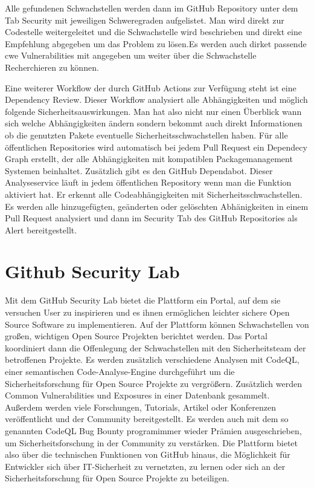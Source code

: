 Alle gefundenen Schwachstellen werden dann im GitHub Repository unter dem Tab Security mit jeweiligen Schweregraden aufgelistet. Man wird direkt zur Codestelle weitergeleitet und die Schwachstelle wird beschrieben und direkt eine Empfehlung abgegeben um das Problem zu lösen.Es werden auch dirket passende \ac{cwe} Vulnerabilities mit angegeben um weiter über die Schwachstelle Recherchieren zu können. \cite{code-scanning}

Eine weiterer Workflow der durch GitHub Actions zur Verfügung steht ist eine Dependency Review. Dieser Workflow analysiert alle Abhängigkeiten und möglich folgende Sicherheitsauswirkungen. Man hat also nicht nur einen Überblick wann sich welche Abhängigkeiten ändern sondern bekommt auch direkt Informationen ob die genutzten Pakete eventuelle Sicherheitsschwachstellen haben.
Für alle öffentlichen Repositories wird automatisch bei jedem Pull Request ein Dependecy Graph erstellt, der alle Abhängigkeiten mit kompatiblen Packagemanagement Systemen beinhaltet.
Zusätzlich gibt es den GitHub Dependabot. Dieser Analyseservice läuft in jedem öffentlichen Repository wenn man die Funktion aktiviert hat. Er erkennt alle Codeabhängigkeiten mit Sicherheitsschwachstellen. Es werden alle hinzugefügten, geänderten oder gelöschten Abhänigkeiten in einem Pull Request analysiert und dann im Security Tab des GitHub Repositories als Alert bereitgestellt.

\section{Github Security Lab}
Mit dem GitHub Security Lab bietet die Plattform ein Portal, auf dem sie versuchen User zu inspirieren und es ihnen ermöglichen leichter sichere Open Source Software zu implementieren. 
Auf der Plattform können Schwachstellen von großen, wichtigen Open Source Projekten berichtet werden. Das Portal koordiniert dann die Offenlegung der Schwachstellen mit den Sicherheitsteam der betroffenen Projekte. Es werden zusätzlich verschiedene Analysen mit CodeQL, einer semantischen Code-Analyse-Engine durchgeführt um die Sicherheitsforschung für Open Source Projekte zu vergrößern. Zusätzlich werden Common Vulnerabilities und Exposures in einer Datenbank gesammelt.
Außerdem werden viele Forschungen, Tutorials, Artikel oder Konferenzen veröffentlicht und der Community bereitgestellt.
Es werden auch mit dem so genannten \glqq CodeQL Bug Bounty program\grqq immer wieder Prämien ausgeschrieben, um Sicherheitsforschung in der Community zu verstärken. Die Plattform bietet also über die technischen Funktionen von GitHub hinaus, die Möglichkeit für Entwickler sich über IT-Sicherheit zu vernetzten, zu lernen oder sich an der Sicherheitsforschung für Open Source Projekte zu beteiligen. \cite{github-securitylab}


